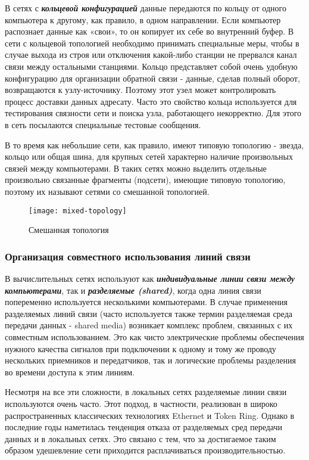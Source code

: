 В сетях с \textbf{\textit{кольцевой конфигурацией}} данные передаются по кольцу от одного компьютера к другому, как правило, в одном направлении.
Если компьютер распознает данные как «свои», то он копирует их себе во внутренний буфер.
В сети с кольцевой топологией необходимо принимать специальные меры, чтобы в случае выхода из строя или отключения какой-либо станции не прервался канал связи между остальными станциями.
Кольцо представляет собой очень удобную конфигурацию для организации обратной связи - данные, сделав полный оборот, возвращаются к узлу-источнику.
Поэтому этот узел может контролировать процесс доставки данных адресату.
Часто это свойство кольца используется для тестирования связности сети и поиска узла, работающего некорректно.
Для этого в сеть посылаются специальные тестовые сообщения.

В то время как небольшие сети, как правило, имеют типовую топологию - звезда, кольцо или общая шина, для крупных сетей характерно наличие произвольных связей между компьютерами.
В таких сетях можно выделить отдельные произвольно связанные фрагменты (подсети), имеющие типовую топологию, поэтому их называют сетями со смешанной топологией.

\begin{figure}[!ht]
    \centering
    \texttt{[image: mixed-topology]}
    \caption{Смешанная топология}
    \label{fig:mixed-topology}
\end{figure}

\subsubsection{Организация совместного использования линий связи}

В вычислительных сетях используют как \textbf{\textit{индивидуальные линии связи между компьютерами}}, так и \textbf{\textit{разделяемые (shared)}}, когда одна линия связи попеременно используется несколькими компьютерами.
В случае применения разделяемых линий связи (часто используется также термин разделяемая среда передачи данных - shared media) возникает комплекс проблем, связанных с их совместным использованием.
Это как чисто электрические проблемы обеспечения нужного качества сигналов при подключении к одному и тому же проводу нескольких приемников и передатчиков, так и логические проблемы разделения во времени доступа к этим линиям.

Несмотря на все эти сложности, в локальных сетях разделяемые линии связи используются очень часто.
Этот подход, в частности, реализован в широко распространенных классических технологиях Ethernet и Token Ring.
Однако в последние годы наметилась тенденция отказа от разделяемых сред передачи данных и в локальных сетях.
Это связано с тем, что за достигаемое таким образом удешевление сети приходится расплачиваться производительностью.

